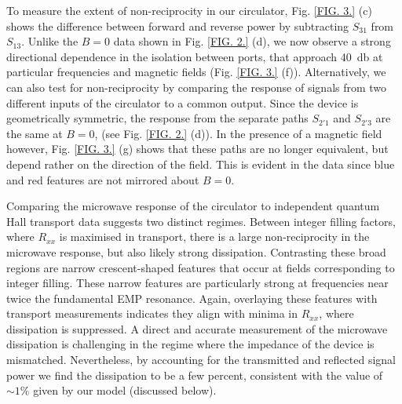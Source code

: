 To measure the extent of non-reciprocity in our circulator, Fig. \ref{FIG. 3.} (c) shows the difference between forward and reverse power by subtracting $S_{31}$ from $S_{13}$. Unlike the $B = 0$ data shown in Fig. \ref{FIG. 2.} (d), we now observe a strong directional dependence in the isolation between ports, that approach \SI{40}{\decibel} at particular frequencies and magnetic fields (Fig. \ref{FIG. 3.} (f)). Alternatively, we can also test for non-reciprocity by comparing the response of signals from two different inputs of the circulator to a common output. Since the device is geometrically symmetric, the response from the separate paths $S_{2'1}$ and $S_{2'3}$ are the same at $B = 0$, (see Fig. \ref{FIG. 2.} (d)). In the presence of a magnetic field however, Fig. \ref{FIG. 3.} (g) shows that these paths are no longer equivalent, but depend rather on the direction of the field. This is evident in the data since blue and red features are not mirrored about $B = 0$.

Comparing the microwave response of the circulator to independent quantum Hall transport data suggests  two distinct regimes. Between integer filling factors, where $R_{xx}$ is maximised in transport, there is a large non-reciprocity in the microwave response, but also likely strong dissipation. Contrasting these broad regions are narrow crescent-shaped features that occur at fields corresponding to integer filling. These narrow features are particularly strong at frequencies near twice the fundamental EMP resonance. Again, overlaying these features with transport measurements indicates they align with minima in $R_{xx}$, where dissipation is suppressed. A direct and accurate measurement of the microwave dissipation is challenging in the regime where the impedance of the device is mismatched. Nevertheless, by accounting for the transmitted and reflected signal power we find the dissipation to be a few percent, consistent with the value of $\sim 1\%$ given by our model (discussed below).

